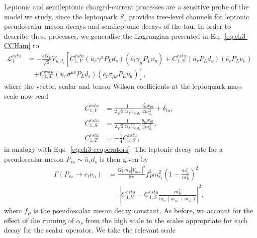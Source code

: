 Leptonic and semileptonic charged-current processes are a sensitive probe of the
model we study, since the leptoquark $S_{1}$ provides tree-level channels for
leptonic pseudoscalar meson decays and semileptonic decays of the tau. In order
to describe these processes, we generalise the Lagrangian presented in
Eq.~\eqref{eq:ch3-CCHam} to
\begin{equation} \label{eq:ch3-CCHam2}
  \begin{split}
    \mathscr{L}^{rstu}_{1} &= -\frac{4 G_F}{\sqrt{2}} V_{u_r d_s} \left[
      C_{1,V}^{rstu}(\bar{u}_r \gamma^\mu P_L d_s)(\bar{e}_t \gamma_\mu P_L
      \nu_{u}) + C^{rstu}_{1,S} (\bar{u}_r P_L d_s)(\bar{e}_t P_L\nu_{u}) \right. \\
    &\quad \left. + C^{rstu}_{1,T} (\bar{u}_r \sigma^{\mu \nu} P_L d_s)
      (\bar{e}_t \sigma_{\mu \nu} P_L \nu_{u})\right],
  \end{split}
\end{equation}
where the vector, scalar and tensor Wilson coefficients at the leptoquark mass
scale now read
\begin{subequations} \label{eq:ch3-ccoperators2}
  \begin{align}
    C_{1,V}^{rstu} &= \frac{1}{2 \sqrt{2} G_F V_{u_r d_s}} \frac{z_{ts}^* x_{ur}}{2m_{S_{1}}^2} + \delta_{tu},\\
    C_{1,S}^{rstu} &= \frac{1}{2 \sqrt{2} G_F V_{u_r d_s}} \frac{y_{t s} x_{u r}}{2m_{S_{1}}^2},\\
    C_{1,T}^{rstu} &= -\frac{1}{4} C_{1,S}^{rstu}, \label{eq:ch3-ccops3}
  \end{align}
\end{subequations}
in analogy with Eqs.~\eqref{eq:ch3-ccoperators}. The leptonic decay rate for a
pseudoscalar meson $P_{rs} \sim \bar{u}_r d_s$ is then given
by~\cite{Becirevic:2016oho}
\begin{equation} \label{eq:ch3-plnu}
  \begin{split}
    \Gamma(P_{rs} \to e_t \nu_{u}) &= \frac{G_F^2 m_P |V_{u_r d_s}|^2}{8\pi} f_P^2 m_{e_t}^2 \left( 1 - \frac{m_{e_u}^2}{m_P^2} \right)^2\\ &\quad \cdot \left| C_{1,V}^{rstu} - C_{1,S}^{rstu} \frac{m_P^2}{m_{e_t}(m_{u_r} + m_{d_s})} \right|^2,
  \end{split}
\end{equation}
where $f_P$ is the pseudoscalar meson decay constant. As before, we account for
the effect of the running of $\alpha_s$ from the high scale to the scales
appropriate for each decay for the scalar operator. We take the relevant scale

